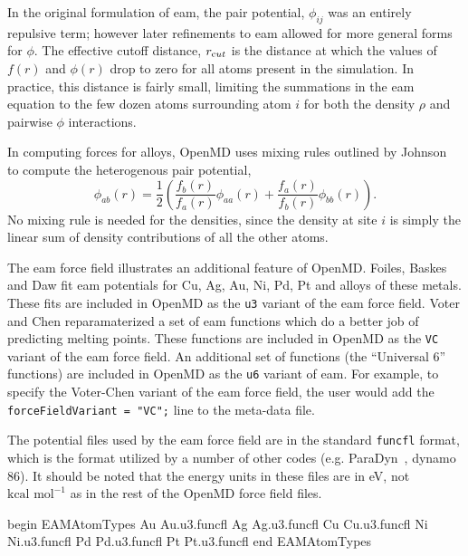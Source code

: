 \documentclass[]{book}
\begin{document}
In the original formulation of {\sc eam}\cite{Daw84}, the pair
potential, $\phi_{ij}$ was an entirely repulsive term; however later
refinements to {\sc eam} allowed for more general forms for
$\phi$.\cite{Daw89} The effective cutoff distance, $r_{{\text cut}}$
is the distance at which the values of $f(r)$ and $\phi(r)$ drop to
zero for all atoms present in the simulation.  In practice, this
distance is fairly small, limiting the summations in the {\sc eam}
equation to the few dozen atoms surrounding atom $i$ for both the
density $\rho$ and pairwise $\phi$ interactions.

In computing forces for alloys, OpenMD uses mixing rules outlined by
Johnson~\cite{johnson89} to compute the heterogenous pair potential,
\begin{equation}
\label{eq:johnson}
\phi_{ab}(r)=\frac{1}{2}\left(
\frac{f_{b}(r)}{f_{a}(r)}\phi_{aa}(r)+
\frac{f_{a}(r)}{f_{b}(r)}\phi_{bb}(r)
\right).
\end{equation}
No mixing rule is needed for the densities, since the density at site
$i$ is simply the linear sum of density contributions of all the other
atoms.

The {\sc eam} force field illustrates an additional feature of {\sc
OpenMD}.  Foiles, Baskes and Daw fit {\sc eam} potentials for Cu, Ag,
Au, Ni, Pd, Pt and alloys of these metals.\cite{FBD86} These fits are
included in {\sc OpenMD} as the {\tt u3} variant of the {\sc eam} force
field.  Voter and Chen reparamaterized a set of {\sc eam} functions
which do a better job of predicting melting points.\cite{Voter:87}
These functions are included in {\sc OpenMD} as the {\tt VC} variant of
the {\sc eam} force field.  An additional set of functions (the
``Universal 6'' functions) are included in {\sc OpenMD} as the {\tt u6}
variant of {\sc eam}.  For example, to specify the Voter-Chen variant
of the {\sc eam} force field, the user would add the {\tt
forceFieldVariant = "VC";} line to the meta-data file.

The potential files used by the {\sc eam} force field are in the
standard {\tt funcfl} format, which is the format utilized by a number
of other codes (e.g. ParaDyn~\cite{Paradyn}, {\sc dynamo 86}).  It
should be noted that the energy units in these files are in eV, not
$\mbox{kcal mol}^{-1}$ as in the rest of the {\sc OpenMD} force field
files.  

\begin{code}[caption={[An example of a EAMAtomTypes block.] A
simple example of a EAMAtomTypes block. Here the only data provided is
the name of a {\tt funcfl} file which contains the raw data for spline
interpolations for the density, functional, and pair potential.},
label={sch:EAMAtomTypes}]
begin EAMAtomTypes
Au      Au.u3.funcfl
Ag      Ag.u3.funcfl
Cu      Cu.u3.funcfl
Ni      Ni.u3.funcfl
Pd      Pd.u3.funcfl
Pt      Pt.u3.funcfl
end EAMAtomTypes
\end{code}
\end{document}
